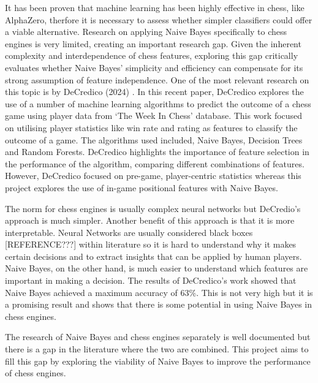 It has been proven that machine learning has been highly effective in chess, like AlphaZero, therfore it is necessary to assess whether simpler classifiers could offer a viable alternative. Research on applying Naive Bayes specifically to chess engines is very limited, creating an important research gap. Given the inherent complexity and interdependence of chess features, exploring this gap critically evaluates whether Naive Bayes' simplicity and efficiency can compensate for its strong assumption of feature independence. One of the most relevant research on this topic is by DeCredico (2024) \cite{decredicoUsingMachineLearning}. In this recent paper, DeCredico explores the use of a number of machine learning algorithms to predict the outcome of a chess game using player data from `The Week In Chess' database. This work focused on utilising player statistics like win rate and rating as features to classify the outcome of a game. The algorithms used included, Naive Bayes, Decision Trees and Random Forests. DeCredico highlights the importance of feature selection in the performance of the algorithm, comparing different combinations of features. However, DeCredico focused on pre-game, player-centric statistics whereas this project explores the use of in-game positional features with Naive Bayes. 

The norm for chess engines is usually complex neural networks but DeCredio's approach is much simpler. Another benefit of this approach is that it is more interpretable. Neural Networks are usually considered black boxes [REFERENCE???] within literature so it is hard to understand why it makes certain decisions and to extract insights that can be applied by human players. Naive Bayes, on the other hand, is much easier to understand which features are important in making a decision. The results of DeCredico's work showed that Naive Bayes achieved a maximum accuracy of 63\%. This is not very high but it is a promising result and shows that there is some potential in using Naive Bayes in chess engines. 

The research of Naive Bayes and chess engines separately is well documented but there is a gap in the literature where the two are combined. This project aims to fill this gap by exploring the viability of Naive Bayes to improve the performance of chess engines.